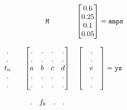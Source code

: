 
%

\[ 
\begin{matrix}
& {\large \mathtt{M}} &
 \begin{bmatrix} 
0.6 \\
0.25 \\
0.1 \\
0.05 \\
\end{bmatrix}
= \mathtt{amps}
\\
\\
\begin{matrix} 
&.& \\
&.& \\
&t_n& \\
&.& \\
&.& \\
\end{matrix}
&
\begin{bmatrix} 
. & . & . & . \\
. & . & . & . \\
a & b & c & d \\
. & . & . & . \\
. & . & . & . \\
\end{bmatrix} 
&
\begin{bmatrix} 
&.& \\
&.& \\
&e& \\
&.& \\
&.& \\
\end{bmatrix} = \mathtt{ys}
\\
\\
&
\begin{matrix}
. & f_k & . & . \\
\end{matrix}
&
\\
\end{matrix}
\]


 
